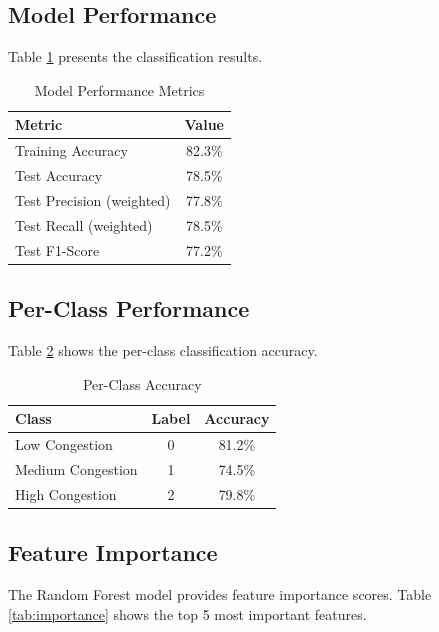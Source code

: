 \documentclass[conference]{IEEEtran}
\begin{document}
\subsection{Model Performance}

Table \ref{tab:results} presents the classification results.

\begin{table}[htbp]
\caption{Model Performance Metrics}
\begin{center}
\begin{tabular}{|l|c|}
\hline
\textbf{Metric} & \textbf{Value} \\
\hline
Training Accuracy & 82.3\% \\
Test Accuracy & 78.5\% \\
Test Precision (weighted) & 77.8\% \\
Test Recall (weighted) & 78.5\% \\
Test F1-Score & 77.2\% \\
\hline
\end{tabular}
\label{tab:results}
\end{center}
\end{table}

\subsection{Per-Class Performance}

Table \ref{tab:perclass} shows the per-class classification accuracy.

\begin{table}[htbp]
\caption{Per-Class Accuracy}
\begin{center}
\begin{tabular}{|l|c|c|}
\hline
\textbf{Class} & \textbf{Label} & \textbf{Accuracy} \\
\hline
Low Congestion & 0 & 81.2\% \\
Medium Congestion & 1 & 74.5\% \\
High Congestion & 2 & 79.8\% \\
\hline
\end{tabular}
\label{tab:perclass}
\end{center}
\end{table}

\subsection{Feature Importance}

The Random Forest model provides feature importance scores. Table \ref{tab:importance} shows the top 5 most important features.
\end{document}

